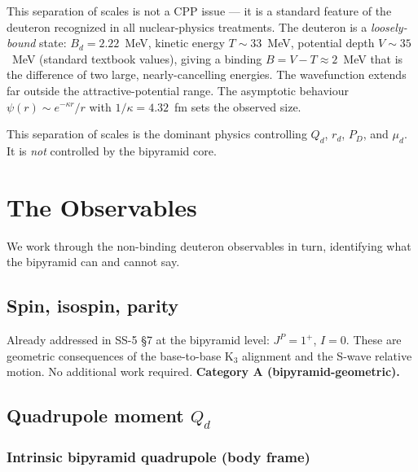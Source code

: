 \documentclass[11pt,letterpaper]{article}
\newcommand{\Bd}{B_{d}}
\newcommand{\Qd}{Q_{d}}
\newcommand{\PD}{P_{D}}
\newcommand{\mud}{\mu_{d}}
\begin{document}
This separation of scales is not a CPP issue --- it is a standard feature of the deuteron recognized in all nuclear-physics treatments. The deuteron is a \emph{loosely-bound} state: $\Bd = 2.22$~MeV, kinetic energy $T \sim 33$~MeV, potential depth $V \sim 35$~MeV (standard textbook values), giving a binding $B = V - T \approx 2$~MeV that is the difference of two large, nearly-cancelling energies. The wavefunction extends far outside the attractive-potential range. The asymptotic behaviour $\psi(r) \sim e^{-\kappa r}/r$ with $1/\kappa = 4.32$~fm sets the observed size.

This separation of scales is the dominant physics controlling $\Qd$, $r_d$, $\PD$, and $\mud$. It is \emph{not} controlled by the bipyramid core.

\section{The Observables}
\label{sec:observables}

We work through the non-binding deuteron observables in turn, identifying what the bipyramid can and cannot say.

\subsection{Spin, isospin, parity}

Already addressed in SS-5 §7 at the bipyramid level: $J^P = 1^+$, $I = 0$. These are geometric consequences of the base-to-base K$_3$ alignment and the S-wave relative motion. No additional work required. \textbf{Category A (bipyramid-geometric).}

\subsection{Quadrupole moment $\Qd$}
\label{sec:Qd}

\subsubsection{Intrinsic bipyramid quadrupole (body frame)}
\end{document}
